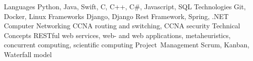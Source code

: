 

\begin{cvskills}

\cvskill
{Languages} %
{Python, Java, Swift, C, C++, C\#, Javascript, SQL} %
\cvskill
{Technologies} %
{Git, Docker, Linux} %
\cvskill
{Frameworks} %
{Django, Django Rest Framework, Spring, .NET} %
\cvskill
{Computer Networking} %
{CCNA routing and switching, CCNA security} %
\cvskill
{Technical Concepts} %
{RESTful web services, web- and web applications, metaheuristics, concurrent computing, scientific computing} %
\cvskill
{Project~Management} %
{Scrum, Kanban, Waterfall model} %

\end{cvskills}
